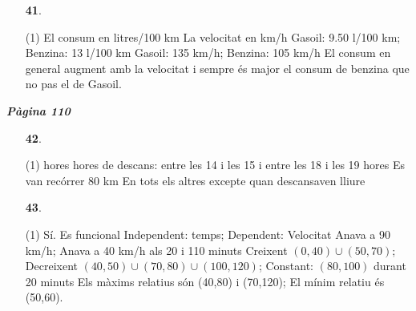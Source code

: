 \documentclass[a4paper, pdf, twoside]{book}
\begin{document}
\begin{multicols}{2}
\begin{enumerate}

 \item[\fontfamily{phv}\selectfont\color{blue}\textbf{41}. ] 
 \begin{tasks}[column-sep=1em, item-indent=1.3333em](1)
	 \task El consum en litres/100 km
	 \task La velocitat en km/h
	 \task* Gasoil: 9.50 l/100 km; Benzina: 13 l/100 km
	 \task* Gasoil: 135 km/h; Benzina: 105 km/h
	 \task* El consum en general augment amb la velocitat i sempre és major el consum de benzina que no pas el de Gasoil.
\end{tasks}
 \end{enumerate}
\vspace{0.3cm}


{\textbf{\em Pàgina 110}} \hrulefill
\begin{enumerate}
\vspace{0.25cm}



 \item[\fontfamily{phv}\selectfont\color{blue}\textbf{42}. ] 
 \begin{tasks}[column-sep=1em, item-indent=1.3333em](1)
	  hores
	  hores de descans: entre les 14 i les 15 i entre les 18 i les 19 hores
	 \task Es van recórrer 80 km
	 \task* En tots els altres excepte quan descansaven
	 \task lliure
\end{tasks}
 \end{enumerate}
\begin{enumerate}
\vspace{0.25cm}



 \item[\fontfamily{phv}\selectfont\color{blue}\textbf{43}. ] 
 \begin{tasks}[column-sep=1em, item-indent=1.3333em](1)
	 \task Sí. Es funcional
	 \task* Independent: temps; Dependent: Velocitat
	 \task* Anava a 90 km/h; Anava a 40 km/h als 20 i 110 minuts
	 \task* Creixent $(0,40)\cup (50,70)$; Decreixent $(40,50)\cup (70,80)\cup (100,120)$; Constant: $(80,100)$ durant 20 minuts
	 \task* Els màxims relatius són (40,80) i (70,120); El mínim relatiu és (50,60). 
\end{tasks}
 \end{enumerate}
\vspace{0.3cm}



\end{multicols}
\end{document}
